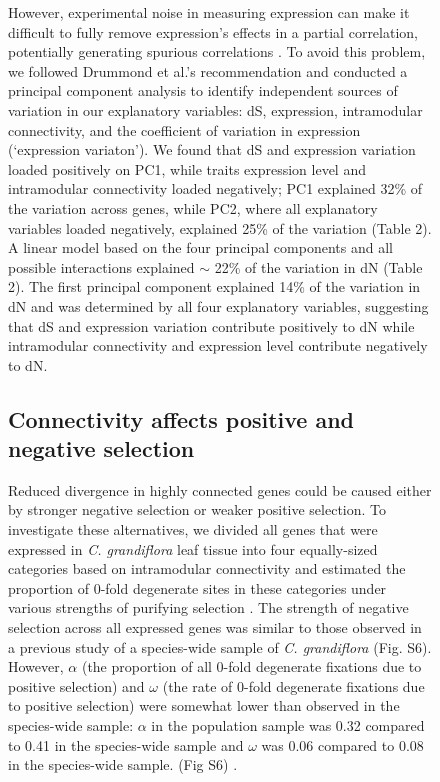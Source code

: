 \begin{figure}[ht!]
However, experimental noise in measuring expression can make it difficult to fully remove expression’s effects in a partial correlation, potentially generating spurious correlations \citep{Drummond2006-pa}. To avoid this problem, we followed Drummond et al.’s recommendation and conducted a principal component analysis to identify independent sources of variation in our explanatory variables: dS, expression, intramodular connectivity, and the coefficient of variation in expression (‘expression variaton’). We found that dS and expression variation loaded positively  on PC1, while traits expression level and intramodular connectivity loaded negatively; PC1 explained 32\% of the variation across genes, while PC2, where all explanatory variables loaded negatively, explained 25\% of the variation (Table 2). A linear model based on the four principal components and all possible interactions explained $\sim$ 22\% of the variation in dN (Table 2). The first principal component explained 14\% of the variation in dN and was determined by all four explanatory variables, suggesting that dS and expression variation contribute positively to dN while intramodular connectivity and expression level contribute negatively to dN. 

\subsection{Connectivity affects positive and negative selection}
Reduced divergence in highly connected genes could be caused either by stronger negative selection or weaker positive selection. To investigate these alternatives, we divided all genes that were expressed in \textit{C. grandiflora} leaf tissue into four equally-sized categories based on intramodular connectivity and estimated the proportion of 0-fold degenerate sites in these categories under various strengths of purifying selection \citep{Eyre-Walker2009-zt}.
The strength of negative selection across all expressed genes was similar to those observed in a previous study of a species-wide sample of \textit{C. grandiflora} (Fig. S6). However, $\alpha$ (the proportion of all 0-fold degenerate fixations due to positive selection) and $\omega$ (the rate of 0-fold degenerate fixations due to positive selection) were somewhat lower than observed in the species-wide sample: $\alpha$ in the population sample was 0.32 compared to 0.41 in the species-wide sample and $\omega$ was 0.06 compared to 0.08 in the species-wide sample. (Fig S6) \citep{Williamson2014-tf}.


\end{figure}
